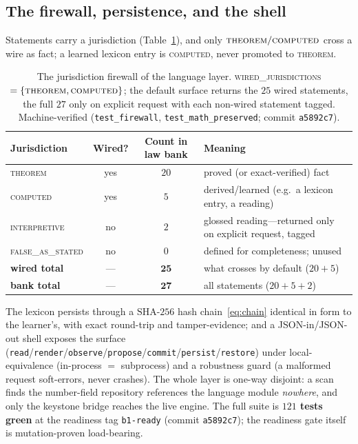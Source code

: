 \documentclass[11pt]{article}
\theoremstyle{plain}
\theoremstyle{definition}
\theoremstyle{remark}
\begin{document}
\subsection{The firewall, persistence, and the shell}
Statements carry a jurisdiction (Table~\ref{tab:firewall}), and only $\textsc{theorem}/\textsc{computed}$
cross a wire as fact; a learned lexicon entry is \textsc{computed}, never promoted to \textsc{theorem}.

\begin{table}[ht]
\centering
\small
\begin{tabular}{lccl}
\toprule
Jurisdiction & Wired? & Count in law bank & Meaning \\
\midrule
\textsc{theorem}          & yes & $20$ & proved (or exact-verified) fact \\
\textsc{computed}         & yes & $5$  & derived/learned (e.g.\ a lexicon entry, a reading) \\
\textsc{interpretive}     & no  & $2$  & glossed reading---returned only on explicit request, tagged \\
\textsc{false\_as\_stated} & no  & $0$  & defined for completeness; unused \\
\midrule
\textbf{wired total} & --- & $\mathbf{25}$ & what crosses by default ($20+5$) \\
\textbf{bank total}  & --- & $\mathbf{27}$ & all statements ($20+5+2$) \\
\bottomrule
\end{tabular}
\caption{The jurisdiction firewall of the language layer. \textsc{wired\_jurisdictions} $=
\{\textsc{theorem},\textsc{computed}\}$; the default surface returns the $25$ wired statements, the full
$27$ only on explicit request with each non-wired statement tagged. Machine-verified
(\texttt{test\_firewall}, \texttt{test\_math\_preserved}; commit \texttt{a5892c7}).}
\label{tab:firewall}
\end{table} The lexicon persists through a
$\mathrm{SHA}\text{-}256$ hash chain~\eqref{eq:chain} identical in form to the learner's, with exact
round-trip and tamper-evidence; and a JSON-in/JSON-out shell exposes the surface
(\texttt{read}/\texttt{render}/\texttt{observe}/\texttt{propose}/\texttt{commit}/\texttt{persist}/\texttt{restore})
under local-equivalence (in-process $=$ subprocess) and a robustness guard (a malformed request soft-errors,
never crashes). The whole layer is one-way disjoint: a scan finds the number-field repository references the
language module \emph{nowhere}, and only the keystone bridge reaches the live engine. The full suite is
\textbf{$121$ tests green} at the readiness tag \texttt{b1-ready} (commit \texttt{a5892c7}); the readiness gate
itself is mutation-proven load-bearing.
\end{document}

